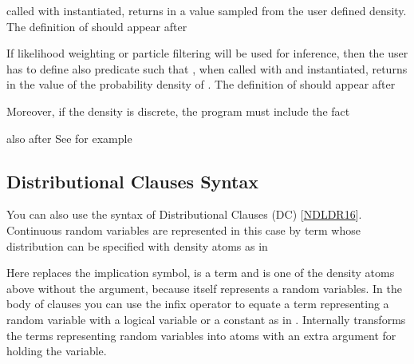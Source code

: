 \documentclass[letterpaper,10pt,english]{sphinxmanual}
\begin{document}
\sphinxAtStartPar
called with  instantiated, returns in  a value sampled from the user defined density.
The definition of  should appear after 

\sphinxAtStartPar
If likelihood weighting or particle filtering will be used for inference, then the user has to define also predicate  such that , when called with  and  instantiated, returns in  the value of the probability density of . The definition of  should appear after 

\sphinxAtStartPar
Moreover, if the density is discrete, the program must include the fact

\begin{sphinxVerbatim}[commandchars=\\\{\}]
\end{sphinxVerbatim}

\sphinxAtStartPar
also after 
See for example 


\subsection{Distributional Clauses Syntax}
\label{\detokenize{index:distributional-clauses-syntax}}
\sphinxAtStartPar
You can also use the syntax of Distributional Clauses (DC) {[}\hyperlink{cite.index:id48}{NDLDR16}{]}.
Continuous random variables are represented in this case by term whose distribution can be specified with density atoms as in

\begin{sphinxVerbatim}[commandchars=\\\{\}]
  
\end{sphinxVerbatim}

\sphinxAtStartPar
Here \sphinxcode{\sphinxupquote{:=}} replaces the implication symbol,  is a term and  is one of the density atoms above without the  argument, because  itself represents a random variables.
In the body of clauses you can use the infix operator \sphinxcode{\sphinxupquote{\textasciitilde{}=}} to equate a term representing a random variable with a logical variable or a constant as in .
Internally  transforms the terms representing random variables into atoms with an extra argument for holding the variable.
\end{document}
